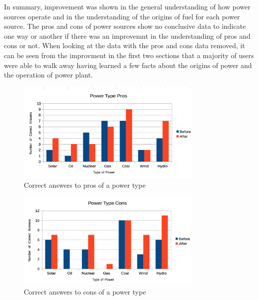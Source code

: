 \documentclass[msc,oneside]{ubcthesis}%
\begin{document}
\indent In summary, improvement was shown in the general understanding of how power sources operate and in the understanding of the origins of fuel for each power source. The pros and cons of power sources show no conclusive data to indicate one way or another if there was an improvemnt in the understanding of pros and cons or not. When looking at the data with the pros and cons data removed, it can be seen from the improvment in the first two sections that a majority of users were able to walk away having learned a few facts about the origins of power and the operation of power plant. 

\newpage
\begin{figure}[hbt]
  \begin{center}
    \includegraphics[width=0.8\textwidth]{survey_pics/post_and_pre/pros}
    \caption[Correct pros ]{Correct answers to pros of a power type}\label{pros}
  \end{center}
\end{figure}

\begin{figure}[hbt]
  \begin{center}
    \includegraphics[width=0.8\textwidth]{survey_pics/post_and_pre/cons}
    \caption[Correct cons]{Correct answers to cons of a power type}\label{cons}
  \end{center}
\end{figure}
\end{document}
